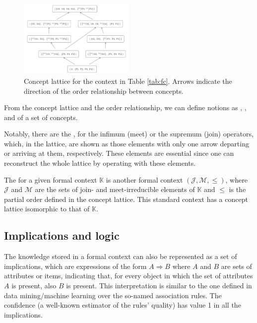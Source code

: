 \begin{figure}

\centering \includegraphics[width=0.5\textwidth]{fig-lattice.pdf}

\caption{\label{fig:lattice}Concept lattice for the context in Table \ref{tab:fc}. Arrows indicate the direction of the order relationship between concepts.}
\end{figure}

From the concept lattice and the order relationship, we can define
notions as , ,  and
 of a set of concepts.

Notably, there are the , for the infimum
(meet) or the supremum (join) operators, which, in the lattice, are
shown as those elements with only one arrow departing or arriving at
them, respectively. These elements are essential since one can
reconstruct the whole lattice by operating with these elements.

The  for a given formal context \(\mathbb{K}\) is
another formal context \((\mathcal{J}, \mathcal{M}, \le)\), where
\(\mathcal{J}\) and \(\mathcal{M}\) are the sets of join- and
meet-irreducible elements of \(\mathbb{K}\) and \(\le\) is the partial
order defined in the concept lattice. This standard context has a
concept lattice isomorphic to that of \(\mathbb{K}\).

\hypertarget{implications-and-logic}{%
\subsection{Implications and logic}\label{implications-and-logic}}

The knowledge stored in a formal context can also be represented as a
set of implications, which are expressions of the form
\(A\Rightarrow B\) where \(A\) and \(B\) are sets of attributes or
items, indicating that, for every object in which the set of attributes
\(A\) is present, also \(B\) is present. This interpretation is similar
to the one defined in data mining/machine learning over the so-named
association rules. The confidence (a well-known estimator of the rules'
quality) has value 1 in all the implications.

